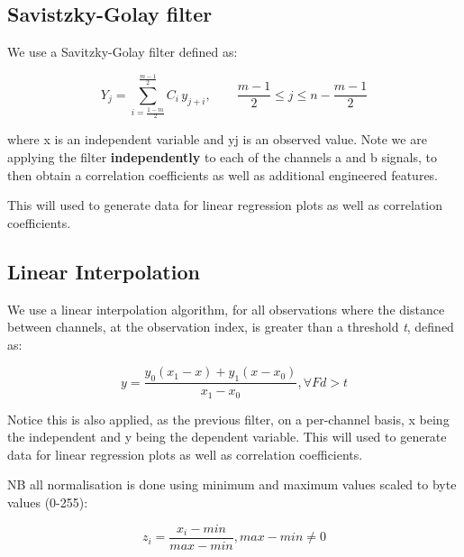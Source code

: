 \subsection{Savistzky-Golay filter}

We use a Savitzky-Golay filter \cite{Savitzky:1964} defined as:

$$ Y_j= \sum _{i=\tfrac{1-m}2}^{\tfrac{m-1}2}C_i\, y_{j+i},\qquad  \frac{m-1}{2} \le j \le n-\frac{m-1}{2} $$

where x is an independent variable and yj is an observed value. Note we are applying the filter \textbf{independently} to each of the channels a and b signals, to then obtain a correlation coefficients as well as additional engineered features.

This will used to generate data for linear regression plots as well as correlation coefficients.

\subsection{Linear Interpolation}

We use a linear interpolation algorithm, for all observations where the distance between channels, at the observation index, is greater than a threshold \textit{t}, defined as:

$$ y = \frac{y_0(x_1-x)+y_1(x-x_0)}{x_1-x_0} , \forall Fd > t $$

Notice this is also applied, as the previous filter, on a per-channel basis, x being the independent and y being the dependent variable.
This will used to generate data for linear regression plots as well as correlation coefficients. 

NB all normalisation is done using minimum and maximum values scaled to byte values (0-255):

$$ z{_i}=\frac{x{_i}-min}{max-min} , max-min \neq 0 $$
